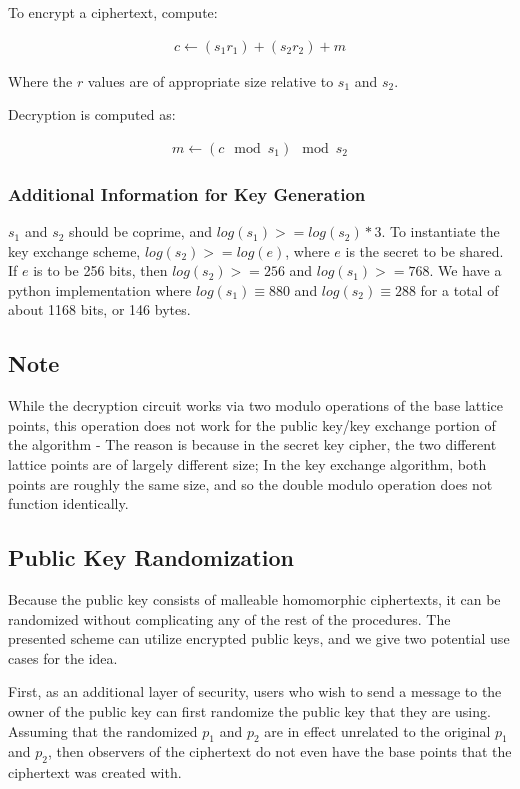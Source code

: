 \documentclass[preprint]{iacrtrans}
\begin{document}
To encrypt a ciphertext, compute:

\begin{align}
   c \gets (s_1 r_1) + (s_2 r_2) + m
\end{align}

Where the $r$ values are of appropriate size relative to $s_1$ and $s_2$. 

Decryption is computed as:

\begin{align}
    m \gets (c \mod s_1) \mod s_2
\end{align}

\subsubsection{Additional Information for Key Generation}
$s_1$ and $s_2$ should be coprime, and $log(s_1) >= log(s_2) * 3$. To instantiate the key exchange scheme, $log(s_2) >= log(e)$, where $e$ is the secret to be shared. If $e$ is to be 256 bits, then $log(s_2) >= 256$ and $log(s_1) >= 768$. We have a python implementation where $log(s_1) \equiv 880$ and $log(s_2) \equiv 288$ for a total of about 1168 bits, or 146 bytes. 

\subsection{Note}
While the decryption circuit works via two modulo operations of the base lattice points, this operation does not work for the public key/key exchange portion of the algorithm - The reason is because in the secret key cipher, the two different lattice points are of largely different size; In the key exchange algorithm, both points are roughly the same size, and so the double modulo operation does not function identically.

\subsection{Public Key Randomization}
Because the public key consists of malleable homomorphic ciphertexts, it can be randomized without complicating any of the rest of the procedures. The presented scheme can utilize encrypted public keys, and we give two potential use cases for the idea.

First, as an additional layer of security, users who wish to send a message to the owner of the public key can first randomize the public key that they are using. Assuming that the randomized $p_1$ and $p_2$ are in effect unrelated to the original $p_1$ and $p_2$, then observers of the ciphertext do not even have the base points that the ciphertext was created with.
\end{document}
